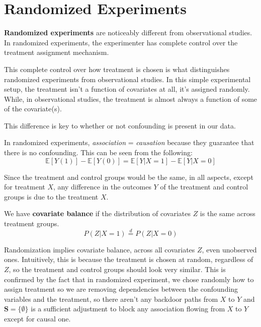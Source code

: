 \chapter{Randomized Experiments}
\textbf{Randomized experiments} are noticeably different from observational studies.
In randomized experiments, the experimenter has complete control over the treatment
assignment mechanism.

This complete control over how treatment is chosen is what distinguishes randomized
experiments from observational studies. In this simple experimental setup, the
treatment isn't a function of covariates at all, it's assigned randomly. While,
in observational studies, the treatment is almost always a function of some of
the covariate(s).

This difference is key to whether or not confounding is present in our data.

In randomized experiments, \textit{association} = \textit{causation} because they
guarantee that there is no confounding. This can be seen from the following:
\begin{equation}
    \mathbb{E}[Y(1)] -  \mathbb{E}[Y(0)] = \mathbb{E}[Y| X = 1] - \mathbb{E}[Y | X = 0]
\end{equation}

Since the treatment and control groups would be the same, in all aspects, except
for treatment $X$, any difference in the outcomes $Y$ of the treatment and control
groups is due to the treatment $X$.
\begin{definition}
    We have \textbf{covariate balance} if the distribution of covariates $Z$ is
    the same across treatment groups.
    \begin{equation}
        P(Z|X = 1) \stackrel{d}{=} P(Z|X = 0)
    \end{equation}
\end{definition}

Randomization implies covariate balance, across all covariates $Z$, even unobserved
ones. Intuitively, this is because the treatment is chosen at random, regardless
of $Z$, so the treatment and control groups should look very similar. This is
confirmed by the fact that in randomized experiment, we chose randomly how to assign
treatment so we are removing dependencies between the confounding variables
and the treatment, so there aren't any backdoor paths from $X$ to $Y$ and $\mathbf{S} =\{\emptyset\}$
is a sufficient adjustment to block any association flowing from $X$ to $Y$ except
for causal one.

